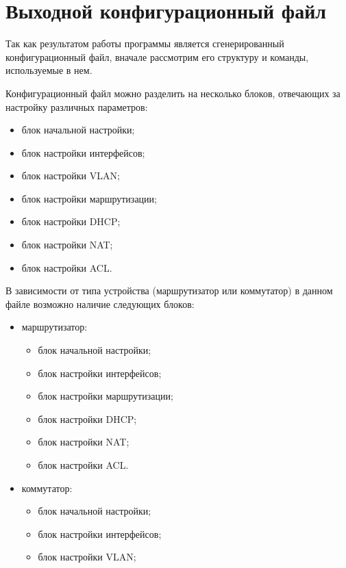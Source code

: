 
\section{Выходной конфигурационный файл}

Так как результатом работы программы является сгенерированный конфигурационный файл, вначале рассмотрим его структуру и команды, используемые в нем.

Конфигурационный файл можно разделить на несколько блоков, отвечающих за настройку различных параметров:

\begin{itemize}
	\item блок начальной настройки;
	\item блок настройки интерфейсов;
	\item блок настройки VLAN;
	\item блок настройки маршрутизации;
	\item блок настройки DHCP;
	\item блок настройки NAT;
	\item блок настройки ACL.
\end{itemize}

В зависимости от типа устройства (маршрутизатор или коммутатор) в данном файле возможно наличие следующих блоков:

\begin{itemize}
	\item маршрутизатор:
	
	\begin{itemize}
		\item блок начальной настройки;
		\item блок настройки интерфейсов;
		\item блок настройки маршрутизации;
		\item блок настройки DHCP;
		\item блок настройки NAT;
		\item блок настройки ACL.
	\end{itemize}
	
	\item коммутатор:
	
	\begin{itemize}
		\item блок начальной настройки;
		\item блок настройки интерфейсов;
		\item блок настройки VLAN;
	\end{itemize}
\end{itemize}

